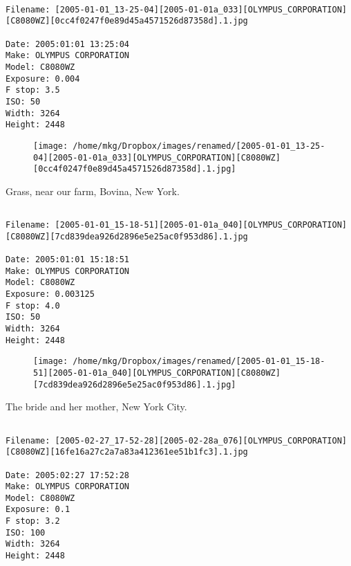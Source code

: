 \clearpage
\onecolumn
\noindent 
\noindent
\begin{lstlisting}

Filename: [2005-01-01_13-25-04][2005-01-01a_033][OLYMPUS_CORPORATION][C8080WZ][0cc4f0247f0e89d45a4571526d87358d].1.jpg

Date: 2005:01:01 13:25:04
Make: OLYMPUS CORPORATION
Model: C8080WZ
Exposure: 0.004
F stop: 3.5
ISO: 50
Width: 3264
Height: 2448
\end{lstlisting}
\clearpage

\begin{figure}
\texttt{[image: /home/mkg/Dropbox/images/renamed/[2005-01-01\_13-25-04][2005-01-01a\_033][OLYMPUS\_CORPORATION][C8080WZ][0cc4f0247f0e89d45a4571526d87358d].1.jpg]}
\end{figure}
    
\clearpage
\onecolumn
\noindent Grass, near our farm, Bovina, New York.
\noindent
\begin{lstlisting}

Filename: [2005-01-01_15-18-51][2005-01-01a_040][OLYMPUS_CORPORATION][C8080WZ][7cd839dea926d2896e5e25ac0f953d86].1.jpg

Date: 2005:01:01 15:18:51
Make: OLYMPUS CORPORATION
Model: C8080WZ
Exposure: 0.003125
F stop: 4.0
ISO: 50
Width: 3264
Height: 2448
\end{lstlisting}
\clearpage

\begin{figure}
\texttt{[image: /home/mkg/Dropbox/images/renamed/[2005-01-01\_15-18-51][2005-01-01a\_040][OLYMPUS\_CORPORATION][C8080WZ][7cd839dea926d2896e5e25ac0f953d86].1.jpg]}
\end{figure}
    
\clearpage
\onecolumn
\noindent The bride and her mother, New York City.
\noindent
\begin{lstlisting}

Filename: [2005-02-27_17-52-28][2005-02-28a_076][OLYMPUS_CORPORATION][C8080WZ][16fe16a27c2a7a83a412361ee51b1fc3].1.jpg

Date: 2005:02:27 17:52:28
Make: OLYMPUS CORPORATION
Model: C8080WZ
Exposure: 0.1
F stop: 3.2
ISO: 100
Width: 3264
Height: 2448
\end{lstlisting}
\clearpage

